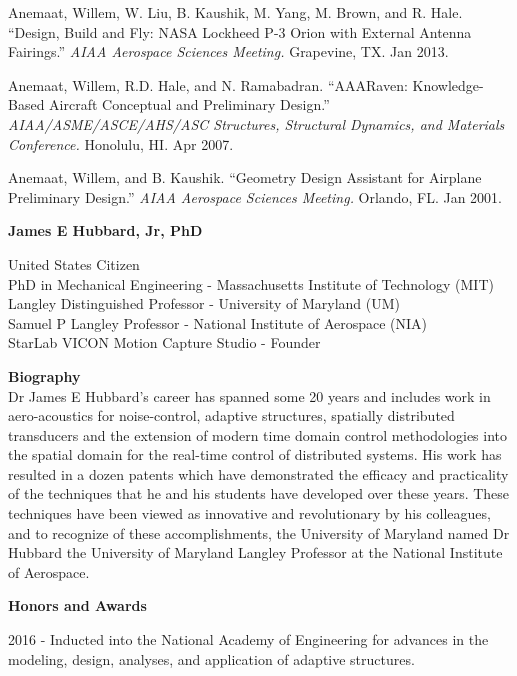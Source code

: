 \documentclass[11pt]{article}
\newcommand{\PubSpace}{\vspace{-0.12cm}}  %
\begin{document}
\PubSpace
Anemaat, Willem, W. Liu, B. Kaushik, M. Yang, M. Brown, and R. Hale.
``Design, Build and Fly: NASA Lockheed P-3 Orion with External Antenna Fairings.''
\emph{AIAA Aerospace Sciences Meeting.}
Grapevine, TX.
Jan 2013.

\PubSpace
Anemaat, Willem, R.D. Hale, and N. Ramabadran.
``AAARaven: Knowledge-Based Aircraft Conceptual and Preliminary Design.''
\emph{AIAA/ASME/ASCE/AHS/ASC Structures, Structural Dynamics, and Materials Conference.}
Honolulu, HI.
Apr 2007.

\PubSpace
Anemaat, Willem, and B. Kaushik.
``Geometry Design Assistant for Airplane Preliminary Design.''
\emph{AIAA Aerospace Sciences Meeting.}
Orlando, FL.
Jan 2001.




\newpage
{\bf \Large James E Hubbard, Jr, PhD}

United States Citizen \\
PhD in Mechanical Engineering - Massachusetts Institute of Technology (MIT)  \\
Langley Distinguished Professor - University of Maryland (UM)  \\
Samuel P Langley Professor - National Institute of Aerospace (NIA) \\
StarLab VICON Motion Capture Studio - Founder


{\bf Biography} \\
Dr James E Hubbard's career has spanned some 20 years and includes work in aero-acoustics for noise-control, adaptive structures, spatially distributed transducers and the extension of modern time domain control methodologies into the spatial domain for the real-time control of distributed systems.  His work has resulted in a dozen patents which have demonstrated the efficacy and practicality of the techniques that he and his students have developed over these years.  These techniques have been viewed as innovative and revolutionary by his colleagues, and to recognize of these accomplishments, the University of Maryland named Dr Hubbard the University of Maryland Langley Professor at the National Institute of Aerospace.


{\bf Honors and Awards} \\
\vspace{-0.2in}

\PubSpace
2016 - Inducted into the National Academy of Engineering for advances in the modeling, design, analyses, and application of adaptive structures.
\end{document}
